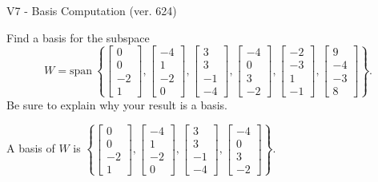 \begin{exercise}
  \begin{exerciseTitle}V7 - Basis Computation (ver. 624)\end{exerciseTitle}
  \begin{exerciseStatement}
    Find a basis for the subspace 
\[W=\mathrm{span}\ \left\{\left[\begin{array}{r}
0 \\
0 \\
-2 \\
1
\end{array}\right] , \left[\begin{array}{r}
-4 \\
1 \\
-2 \\
0
\end{array}\right] , \left[\begin{array}{r}
3 \\
3 \\
-1 \\
-4
\end{array}\right] , \left[\begin{array}{r}
-4 \\
0 \\
3 \\
-2
\end{array}\right] , \left[\begin{array}{r}
-2 \\
-3 \\
1 \\
-1
\end{array}\right] , \left[\begin{array}{r}
9 \\
-4 \\
-3 \\
8
\end{array}\right]\right\}.\]
 Be sure to explain why your result is a basis.


  \end{exerciseStatement}
  \begin{exerciseAnswer}
   A basis of \(W\) is  \(\left\{\left[\begin{array}{r}
0 \\
0 \\
-2 \\
1
\end{array}\right] , \left[\begin{array}{r}
-4 \\
1 \\
-2 \\
0
\end{array}\right] , \left[\begin{array}{r}
3 \\
3 \\
-1 \\
-4
\end{array}\right] , \left[\begin{array}{r}
-4 \\
0 \\
3 \\
-2
\end{array}\right]\right\}\).
  


  \end{exerciseAnswer}
\end{exercise}